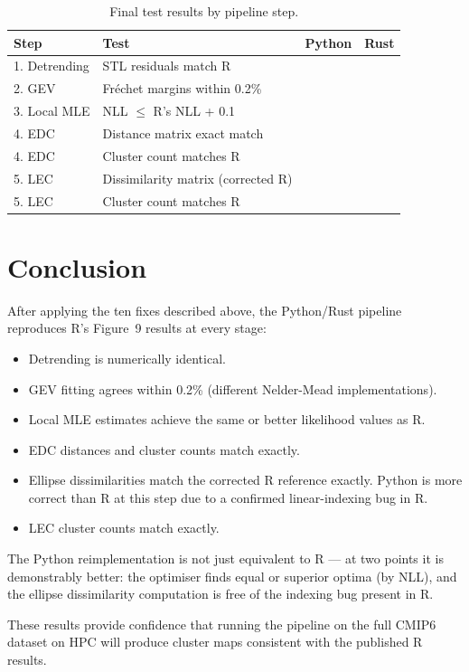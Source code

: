 \documentclass[12pt,a4paper]{article}
\newcommand{\cmark}{\ding{51}}
\begin{document}
\begin{table}[h]
\centering
\caption{Final test results by pipeline step.}
\label{tab:tests}
\begin{tabular}{llcc}
\toprule
\textbf{Step} & \textbf{Test} & \textbf{Python} & \textbf{Rust} \\
\midrule
1. Detrending & STL residuals match R & \cmark & \cmark \\
2. GEV & Fr\'echet margins within 0.2\% & \cmark & \cmark \\
3. Local MLE & NLL $\leq$ R's NLL + 0.1 & \cmark & \cmark \\
4. EDC & Distance matrix exact match & \cmark & \cmark \\
4. EDC & Cluster count matches R & \cmark & \cmark \\
5. LEC & Dissimilarity matrix (corrected R) & \cmark & \cmark \\
5. LEC & Cluster count matches R & \cmark & \cmark \\
\bottomrule
\end{tabular}
\end{table}

\section{Conclusion}

After applying the ten fixes described above, the Python/Rust
pipeline reproduces R's Figure~9 results at every stage:

\begin{itemize}[nosep]
  \item Detrending is numerically identical.
  \item GEV fitting agrees within 0.2\% (different Nelder-Mead
        implementations).
  \item Local MLE estimates achieve the same or better likelihood
        values as R.
  \item EDC distances and cluster counts match exactly.
  \item Ellipse dissimilarities match the corrected R reference
        exactly.  Python is more correct than R at this step due
        to a confirmed linear-indexing bug in R.
  \item LEC cluster counts match exactly.
\end{itemize}

The Python reimplementation is not just equivalent to R --- at two
points it is demonstrably better: the optimiser finds equal or
superior optima (by NLL), and the ellipse dissimilarity computation
is free of the indexing bug present in R.

These results provide confidence that running the pipeline on the
full CMIP6 dataset on HPC will produce cluster maps consistent
with the published R results.
\end{document}
